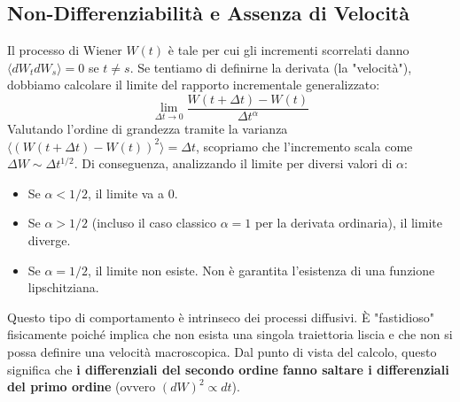 \documentclass[12pt,a4paper]{article}
\begin{document}
\subsection{Non-Differenziabilità e Assenza di Velocità}
Il processo di Wiener $W(t)$ è tale per cui gli incrementi scorrelati danno $\langle dW_t dW_s \rangle = 0$ se $t \neq s$. Se tentiamo di definirne la derivata (la "velocità"), dobbiamo calcolare il limite del rapporto incrementale generalizzato:
\begin{equation}
\lim_{\Delta t \to 0} \frac{W(t+\Delta t) - W(t)}{\Delta t^\alpha}
\end{equation}
Valutando l'ordine di grandezza tramite la varianza $\langle (W(t+\Delta t) - W(t))^2 \rangle = \Delta t$, scopriamo che l'incremento scala come $\Delta W \sim \Delta t^{1/2}$. Di conseguenza, analizzando il limite per diversi valori di $\alpha$:
\begin{itemize}
    \item Se $\alpha < 1/2$, il limite va a 0.
    \item Se $\alpha > 1/2$ (incluso il caso classico $\alpha=1$ per la derivata ordinaria), il limite diverge.
    \item Se $\alpha = 1/2$, il limite non esiste. Non è garantita l'esistenza di una funzione lipschitziana.
\end{itemize}
Questo tipo di comportamento è intrinseco dei processi diffusivi. È "fastidioso" fisicamente poiché implica che non esista una singola traiettoria liscia e che non si possa definire una velocità macroscopica. Dal punto di vista del calcolo, questo significa che \textbf{i differenziali del secondo ordine fanno saltare i differenziali del primo ordine} (ovvero $(dW)^2 \propto dt$).
\end{document}
